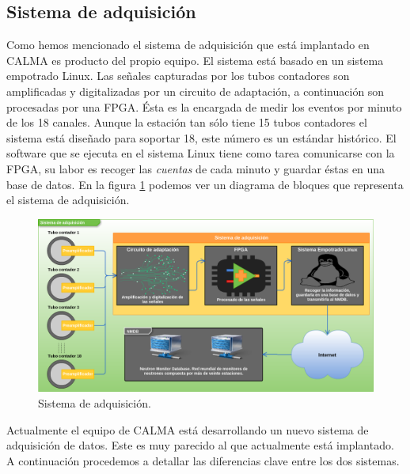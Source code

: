 	\subsection{Sistema de adquisición}
		Como hemos mencionado el sistema de adquisición que está implantado en CALMA es producto del propio equipo\cite{Garcia2014}. El
		sistema está basado en un sistema empotrado Linux. Las señales capturadas por los tubos contadores son amplificadas y digitalizadas por
		un circuito de adaptación, a continuación son procesadas por una FPGA. Ésta es la encargada de medir los eventos por minuto de los 18
		canales. Aunque la  estación tan sólo tiene 15 tubos contadores el sistema está diseñado para soportar 18, este número es un estándar
		histórico. El software que se ejecuta en el sistema Linux tiene como tarea comunicarse con la FPGA, su labor es recoger las
		\emph{cuentas} de cada minuto y guardar éstas en una base de datos. En la figura \ref{fig:acqsis} podemos ver un diagrama de bloques
		que representa el sistema de adquisición.
		\begin{figure}[h]
			\centering
			\includegraphics[keepaspectratio, width=1\textwidth]{./img/AcqSis.png}
			\caption{Sistema de adquisición.}
			\label{fig:acqsis}
		\end{figure}
		\par
		Actualmente el equipo de CALMA está desarrollando un nuevo sistema de adquisición de datos. Este es muy parecido al que actualmente
		está implantado. A continuación procedemos a detallar las diferencias clave entre los dos sistemas. 
		\par
